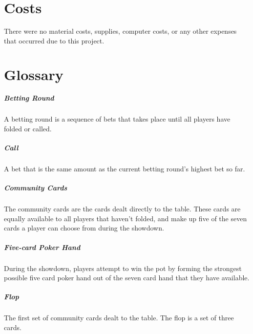 
\clearpage

\chapter*{Costs}
There were no material costs, supplies, computer costs, or any other expenses that occurred due to this project.

\clearpage



\chapter*{Glossary}

\paragraph*{Betting Round} A betting round is a sequence of bets that takes place until all players have folded or called.

\paragraph*{Call} A bet that is the same amount as the current betting round's highest bet so far.
 
\paragraph*{Community Cards} The community cards are the cards dealt directly to the table. These cards are equally available to all players that haven't folded, and make up five of the seven cards a player can choose from during the showdown.
 
\paragraph*{Five-card Poker Hand} During the showdown, players attempt to win the pot by forming the strongest possible five card poker hand out of the seven card hand that they have available.
 
\paragraph*{Flop} The first set of community cards dealt to the table. The flop is a set of three cards.


